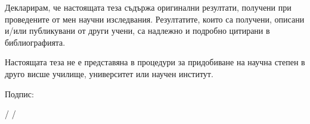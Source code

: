 \documentclass[12pt,bulgarian,singlespacing,headsepline,oneside,openany]{thesis}
\begin{document}

\begin{declaration}

\vspace{2cm}

Декларирам, че настоящата теза съдържа оригинални резултати, получени при проведените от мен научни изследвания. Резултатите, които са получени, описани и/или публикувани от други учени, са надлежно и подробно цитирани в библиографията.

\vspace{0.5cm}

Настоящата теза не е представяна в процедури за придобиване на научна степен в друго висше училище, университет или научен институт.

\vspace{2cm}

\hspace{4cm}
Подпис: 

\vspace{0.25cm}

\hspace{5cm}
/ \aname /
\end{declaration}


\newpage
\tableofcontents


\newpage


\newpage

\end{document}
